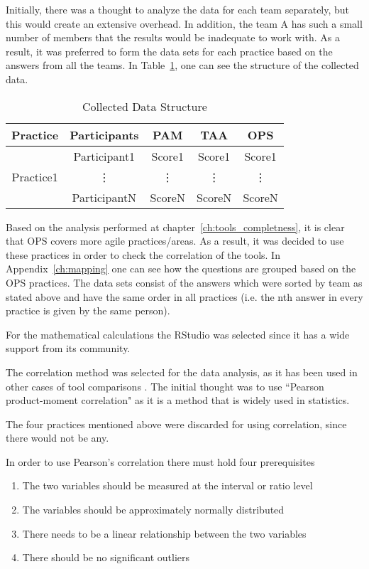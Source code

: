 Initially, there was a thought to analyze the data for each team separately, but this would create an extensive overhead. In addition, the team A has such a small number of members that the results would be inadequate to work with. As a result, it was preferred to form the data sets for each practice based on the answers from all the teams. In Table~\ref{table:data_structure}, one can see the structure of the collected data.

\begin{table} [H]
	\caption{Collected Data Structure}
	\label{table:data_structure}
	\begin{tabular}{| c | c | c | c | c |} \hline
	\textbf{Practice} & \textbf{Participants} & \textbf{PAM} & \textbf{TAA} & \textbf{OPS} \\ \hline
	\multirow{3}{*}{Practice1} & Participant1 & Score1 & Score1 & Score1 \\ \hhline{~----}
	& \vdots & \vdots & \vdots  & \vdots \\ \hhline{~----}
	& ParticipantN & ScoreN & ScoreN & ScoreN \\ \hline
	\end{tabular}
\end{table}

Based on the analysis performed at chapter~\ref{ch:tools_completness}, it is clear that OPS covers more agile practices/areas. As a result, it was decided to use these practices in order to check the correlation of the tools. In Appendix~\ref{ch:mapping} one can see how the questions are grouped based on the OPS practices. The data sets consist of the answers which were sorted by team as stated above and have the same order in all practices (i.e. the nth answer in every practice is given by the same person).

For the mathematical calculations the RStudio \texttrademark \cite{rstudio} was selected since it has a wide support from its community. 

The correlation method was selected for the data analysis, as it has been used in other cases of tool comparisons \cite{jalali_angelis} \cite{Delestras2013}. The initial thought was to use ``Pearson product-moment correlation" as it is a method that is widely used in statistics. 

The four practices mentioned above were discarded for using correlation, since there would not be any.

In order to use Pearson’s correlation there must hold four prerequisites
\begin{enumerate}
\item The two variables should be measured at the interval or ratio level
\item The variables should be approximately normally distributed
\item There needs to be a linear relationship between the two variables
\item There should be no significant outliers
\end{enumerate}

